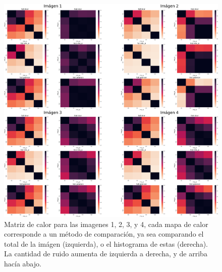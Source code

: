 \begin{figure}
    \centering
    \includegraphics[width=\textwidth]{figuras/heatmaps/heatmaps_app_0.png}
    \caption{Matriz de calor para las imagenes 1, 2, 3, y 4, cada mapa de calor corresponde a un m\'etodo de comparaci\'on, ya sea comparando el total de la im\'agen (izquierda), o el histograma de estas (derecha). La cantidad de ruido aumenta de izquierda a derecha, y de arriba hacía abajo.}
\end{figure}

